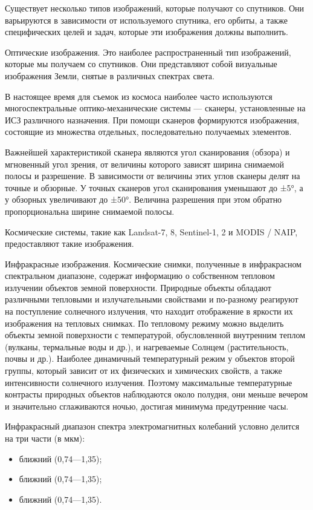 \documentclass[14pt, russian]{scrartcl}
\begin{document}
Существует несколько типов изображений, которые получают со спутников. Они варьируются в зависимости от используемого спутника, его орбиты, а также специфических целей и задач, которые эти изображения должны выполнить.

Оптические изображения. Это наиболее распространенный тип изображений, которые мы получаем со спутников. Они представляют собой визуальные изображения Земли, снятые в различных спектрах света.

В настоящее время для съемок из космоса наиболее часто используются многоспектральные оптико-механические системы — сканеры, установленные на ИСЗ различного назначения. При помощи сканеров формируются изображения, состоящие из множества отдельных, последовательно получаемых элементов.

Важнейшей характеристикой сканера являются угол сканирования (обзора) и мгновенный угол зрения, от величины которого зависят ширина снимаемой полосы и разрешение. В зависимости от величины этих углов сканеры делят на точные и обзорные. У точных сканеров угол сканирования уменьшают до ±5°, а у обзорных увеличивают до ±50°. Величина разрешения при этом обратно пропорциональна ширине снимаемой полосы.

Космические системы, такие как Landsat-7, 8, Sentinel-1, 2 и MODIS / NAIP, предоставляют такие изображения.

Инфракрасные изображения. Космические снимки, полученные в инфракрасном спектральном диапазоне, содержат информацию о собственном тепловом излучении объектов земной поверхности. Природные объекты обладают различными тепловыми и излучательными свойствами и по-разному реагируют на поступление солнечного излучения, что находит отображение в яркости их изображения на тепловых снимках. По тепловому режиму можно выделить объекты земной поверхности с температурой, обусловленной внутренним теплом (вулканы, термальные воды и др.), и нагреваемые Солнцем (растительность, почвы и др.). Наиболее динамичный температурный режим у объектов второй группы, который зависит от их физических и химических свойств, а также интенсивности солнечного излучения. Поэтому максимальные температурные контрасты природных объектов наблюдаются около полудня, они меньше вечером и значительно сглаживаются ночью, достигая минимума предутренние часы.

Инфракрасный диапазон спектра электромагнитных колебаний условно делится на три части (в мкм):

\begin{itemize}
    \item ближний (0,74—1,35);
    \item ближний (0,74—1,35);
    \item ближний (0,74—1,35).
\end{itemize}
\end{document}
